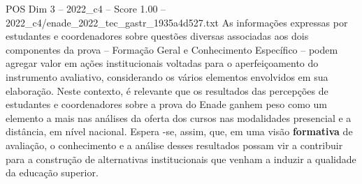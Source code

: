 \begin{textsample}{POS Dim 3 – 2022\_c4 – Score 1.00 – 2022\_c4/enade\_2022\_tec\_gastr\_1935a4d527.txt}
As informações expressas por estudantes e coordenadores sobre questões diversas associadas aos dois componentes da prova – Formação Geral e Conhecimento Específico – podem agregar valor em ações institucionais voltadas para o aperfeiçoamento do instrumento avaliativo, considerando os vários elementos envolvidos em sua elaboração.
Neste contexto, é relevante que os resultados das percepções de estudantes e coordenadores sobre a prova do Enade ganhem peso como um elemento a mais nas análises da oferta dos cursos nas modalidades presencial e a distância, em nível nacional.
Espera -se, assim, que, em uma visão \textbf{formativa} de avaliação, o conhecimento e a análise desses resultados possam vir a contribuir para a construção de alternativas institucionais que venham a induzir a qualidade da educação superior.

\end{textsample}
